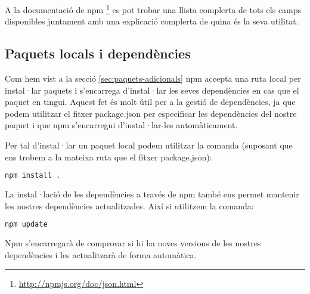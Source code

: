 A la documentació de npm \footnote{\url{http://npmjs.org/doc/json.html}} es pot trobar una llista complerta de tots els camps disponibles juntament amb una explicació complerta de quina és la seva utilitat. 

\subsection{Paquets locals i dependències}

Com hem vist a la secció \ref{sec:paquets-adicionals} npm accepta una ruta local per instal·lar paquets i s'encarrega d'instal·lar les seves dependències en cas que el paquet en tingui. Aquest fet és molt útil per a la gestió de dependències, ja que podem utilitzar el fitxer package.json per especificar les dependències del nostre paquet i que npm s'encarregui d'instal·lar-les automàticament. 

Per tal d'instal·lar un paquet local podem utilitzar la comanda (suposant que ens trobem a la mateixa ruta que el fitxer package.json): 

\begin{lstlisting}[language=bash]
npm install . 
\end{lstlisting}

La instal·lació de les dependències a través de npm també ens permet mantenir les nostres dependències actualitzades. Així si utilitzem la comanda: 

\begin{lstlisting}[language=bash]
npm update
\end{lstlisting}

Npm s'encarregarà de comprovar si hi ha noves versions de les nostres dependències i les actualitzarà de forma automàtica. 




